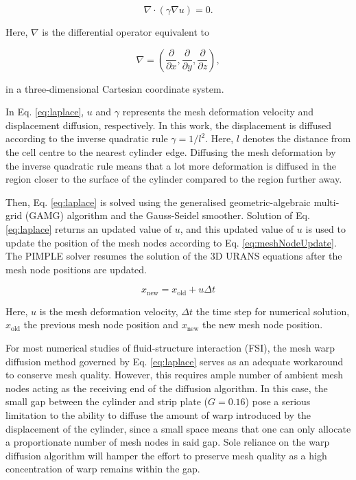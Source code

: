 \documentclass[oneside]{utmthesis}
\begin{document}
\begin{equation}
  \nabla \cdot \left( \gamma \nabla u \right) = 0.
  \label{eq:laplace}
\end{equation}

\noindent Here, $\nabla$ is the differential operator equivalent to

\begin{equation}
  \nabla = \left( \frac{\partial}{\partial x}, \frac{\partial}{\partial y}, \frac{\partial}{\partial z} \right),
  \label{eq:nabla}
\end{equation}

\noindent in a three-dimensional Cartesian coordinate system.

In Eq. \ref{eq:laplace}, $u$ and $\gamma$ represents the mesh deformation velocity and displacement diffusion, respectively. In this work, the displacement is diffused according to the inverse quadratic rule $\gamma = 1/l^{2}$. Here, $l$ denotes the distance from the cell centre to the nearest cylinder edge. Diffusing the mesh deformation by the inverse quadratic rule means that a lot more deformation is diffused in the region closer to the surface of the cylinder compared to the region further away.

Then, Eq. \ref{eq:laplace} is solved using the generalised geometric-algebraic multi-grid (GAMG) algorithm and the Gauss-Seidel smoother. Solution of Eq. \ref{eq:laplace} returns an updated value of $u$, and this updated value of $u$ is used to update the position of the mesh nodes according to Eq. \ref{eq:meshNodeUpdate}. The PIMPLE solver resumes the solution of the 3D URANS equations after the mesh node positions are updated.

\begin{equation}
  x_{\text{new}} = x_{\text{old}} + u \Delta t
  \label{eq:meshNodeUpdate}
\end{equation}

\noindent Here, $u$ is the mesh deformation velocity, $\Delta t$ the time step for numerical solution, $x_{\text{old}}$ the previous mesh node position and $x_{\text{new}}$ the new mesh node position.

For most numerical studies of fluid-structure interaction (FSI), the mesh warp diffusion method governed by Eq. \ref{eq:laplace} serves as an adequate workaround to conserve mesh quality. However, this requires ample number of ambient mesh nodes acting as the receiving end of the diffusion algorithm. In this case, the small gap between the cylinder and strip plate ($G = 0.16$) pose a serious limitation to the ability to diffuse the amount of warp introduced by the displacement of the cylinder, since a small space means that one can only allocate a proportionate number of mesh nodes in said gap. Sole reliance on the warp diffusion algorithm will hamper the effort to preserve mesh quality as a high concentration of warp remains within the gap.
\end{document}
